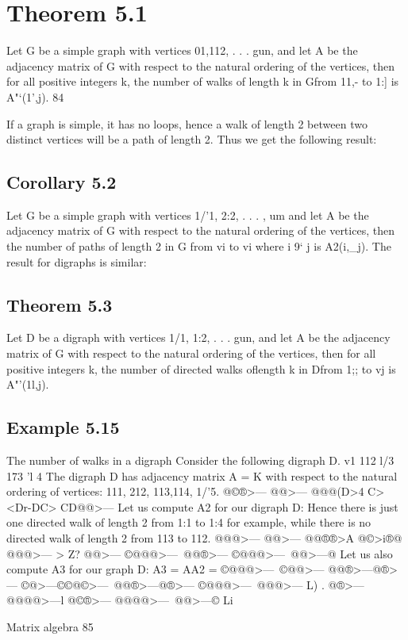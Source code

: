 {\section{Theorem 5.1}
 Let G be a simple graph with vertices 01,112, . . . gun, and let
A be the adjacency matrix of G with respect to the natural ordering of
the vertices, then for all positive integers k, the number of walks of
length k in Gfrom 11,- to 1:] is A"‘(1',j).
84



If a graph is simple, it has no loops, hence a walk of length 2
between two distinct vertices will be a path of length 2. Thus we get
the following result:

\subsection{Corollary 5.2} Let G be a simple graph with vertices 1/'1, 2:2, . . . , um and
let A be the adjacency matrix of G with respect to the natural ordering
of the vertices, then the number of paths of length 2 in G from vi to vi
where i 9‘ j is A2(i,_j).
The result for digraphs is similar:
\subsection{Theorem 5.3} Let D be a digraph with vertices 1/1, 1:2, . . . gun, and let A
be the adjacency matrix of G with respect to the natural ordering of
the vertices, then for all positive integers k, the number of directed
walks oflength k in Dfrom 1;; to vj is A"'(1l,j).
\subsection{Example 5.15} The number of walks in a digraph
Consider the following digraph D.
v1 112
l/3
173 ’l 4
The digraph D has adjacency matrix
A = K
with respect to the natural ordering of vertices: 111, 212, 113,114, 1/'5.
@©®>—\@
@@>—\@@
@@@(D>4
C><Dr-\<DC>
CD@@>—\Q
Let us compute A2 for our digraph D:
Hence there is just one directed walk of length 2 from 1:1 to 1:4 for
example, while there is no directed walk of length 2 from 113 to 112.
@@@>—\@
@@>—\@@
@@®®>A
@©>i®@
@@@>—\@
 >
Z?
@@>—\@@
©@@@>—\
@@®>—\@
©@@@>—\
@@>—\®@
Let us also compute A3 for our graph D:
A3 = AA2 =
©@@@>—@@>—\©
@@®>—®>—\@@
©@>—\@@ ©©@©>—\
@@®>—\@ @®>—\@@
©@@@>—@>—\@
L)
.
@®>—\@@
@@@@>—l
@©®>—\@
@@@@>—\
@@>—\@©
Li}
Matrix algebra
85



